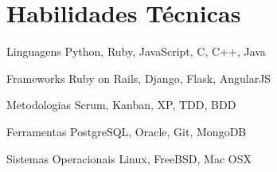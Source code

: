\documentclass{tccv}
\begin{document}
\section{Habilidades Técnicas}

\begin{factlist}

\item{Linguagens}
     {Python, Ruby, JavaScript, C, C++, Java}
     
\item{Frameworks}
     {Ruby on Rails, Django, Flask, AngularJS}
     
\item{Metodologias}
     {Scrum, Kanban, XP, TDD, BDD}

\item{Ferramentas}
     {PostgreSQL, Oracle, Git, MongoDB}

\item{Sistemas Operacionais}
     {Linux, FreeBSD, Mac OSX}

\end{factlist}
\end{document}
